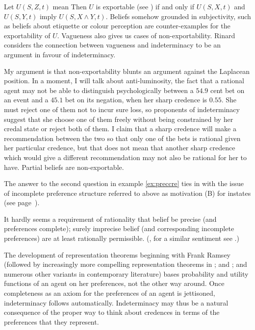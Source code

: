 \documentclass[11pt]{article}
\begin{document}
Let $U(S,Z,t)$ mean  Then $U$ is exportable (see ) if
and only if $U(S,X,t)$ and $U(S,Y,t)$ imply $U(S,X\wedge{}Y,t)$.
Beliefs somehow grounded in subjectivity, such as beliefs about
etiquette or colour perception are counter-examples for the
exportability of $U$. Vagueness also gives us cases of
non-exportability. Rinard considers the connection between vagueness
and indeterminacy to be an argument in favour of indeterminacy.

My argument is that non-exportability blunts an argument against the
Laplacean position. In a moment, I will talk about anti-luminosity,
the fact that a rational agent may not be able to distinguish
psychologically between a $54.9$ cent bet on an event and a $45.1$ bet
on its negation, when her sharp credence is $0.55$. She must reject
one of them not to incur sure loss, so proponents of indeterminacy
suggest that she choose one of them freely without being constrained
by her credal state or reject both of them. I claim that a sharp
credence will make a recommendation between the two so that only one
of the bets is rational given her particular credence, but that does
not mean that another sharp credence which would give a different
recommendation may not also be rational for her to have. Partial
beliefs are non-exportable.

The answer to the second question in example \ref{ex:preccre} ties in
with the issue of incomplete preference structure referred to above as
motivation (B) for instates (see page~\pageref{page:houwieve}).

\begin{quotex}
  It hardly seems a requirement of rationality that belief be precise
  (and preferences complete); surely imprecise belief (and
  corresponding incomplete preferences) are at least rationally
  permissible. (, for a similar sentiment
  see .)
\end{quotex}

The development of representation theorems beginning with Frank Ramsey
(followed by increasingly more compelling representation theorems in
; and ; and numerous other
variants in contemporary literature) bases probability and utility
functions of an agent on her preferences, not the other way around.
Once completeness as an axiom for the preferences of an agent is
jettisoned, indeterminacy follows automatically. Indeterminacy may
thus be a natural consequence of the proper way to think about
credences in terms of the preferences that they represent.
\end{document}
